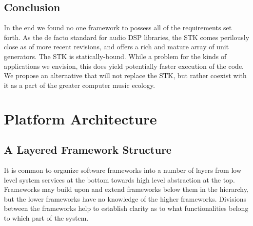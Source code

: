 \documentclass[twoside,10pt]{article}
\begin{document}


\subsection{Conclusion} %

In the end we found no one framework to possess all of the requirements set forth.  As the de facto standard for audio DSP libraries, the STK comes perilously close as of more recent revisions\cite{Scavone:2005}, and offers a rich and mature array of unit generators.  The STK is statically-bound.  While a problem for the kinds of applications we envision, this does yield potentially faster execution of the code.  We propose an alternative that will not replace the STK, but rather coexist with it as a part of the greater computer music ecology.

%
%






\section{Platform Architecture} %

\subsection{A Layered Framework Structure}

It is common to organize software frameworks into a number of layers from low level system services at the bottom towards high level abstraction at the top.  Frameworks may build upon and extend frameworks below them in the hierarchy, but the lower frameworks have no knowledge of the higher frameworks. Divisions between the frameworks help to establish clarity as to what functionalities belong to which part of the system. 
\end{document}
